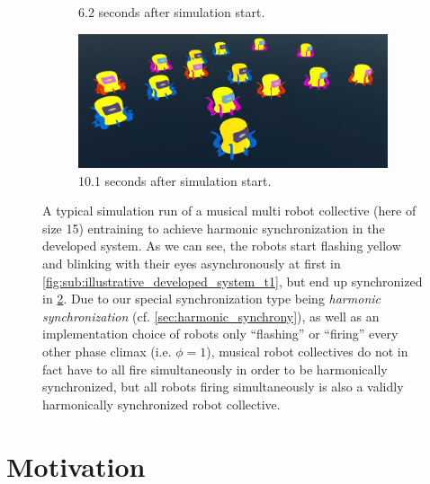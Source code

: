 \begin{figure}[!ht]
\begin{subfigure}[b]{0.495\textwidth}
	\caption{6.2 seconds after simulation start.}
	\label{fig:sub:illustrative_developed_system_t3}
  \end{subfigure}
  \begin{subfigure}[b]{0.495\textwidth}
	\centering\captionsetup{width=.9\linewidth}%
	\includegraphics[width=\textwidth]{Assets/DocSegments/Chapters/Introduction/Figures/illustrative_system_result_figure_s10p1.png}
	\caption{10.1 seconds after simulation start.}
	\label{fig:sub:illustrative_developed_system_t4}
  \end{subfigure}
  \caption[Developed synchronization simulator inspired by synchronously flashing fireflies.]{A typical simulation run of a musical multi robot collective (here of size 15) entraining to achieve harmonic synchronization in the developed system. As we can see\protect\footnotemark, the robots start flashing yellow and blinking with their eyes asynchronously at first in \ref{fig:sub:illustrative_developed_system_t1}, but end up synchronized in \ref{fig:sub:illustrative_developed_system_t4}. Due to our special synchronization type being \textit{harmonic synchronization} (cf. \ref{sec:harmonic_synchrony}), as well as an implementation choice of robots only ``flashing'' or ``firing'' every other phase climax (i.e. $\phi=1$), musical robot collectives do not in fact have to all fire simultaneously in order to be harmonically synchronized, but all robots firing simultaneously is also a validly harmonically synchronized robot collective.}
  \label{fig:illustrative_developed_system}
\end{figure}





\section{Motivation}

